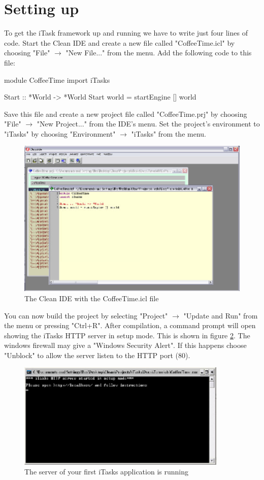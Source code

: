 \documentclass[a4paper,11pt]{article}
\begin{document}
\section{Setting up}
To get the iTask framework up and running we have to write just four lines of code. Start the Clean IDE and create a new file called "CoffeeTime.icl" by choosing  "File" $\rightarrow$ "New File..." from the menu. Add the following code to this file:
\begin{CleanCode}
module CoffeeTime
import iTasks

Start :: *World -> *World
Start world = startEngine [] world
\end{CleanCode}
Save this file and create a new project file called "CoffeeTime.prj" by choosing "File" $\rightarrow$ "New Project..." from the IDE's menu. Set the project's environment to "iTasks" by choosing "Environment" $\rightarrow$ "iTasks" from the menu.
\begin{figure}[h]
\centerline{\includegraphics[width=12cm]{GettingStarted-img/ide-version1.eps}}
\caption{The Clean IDE with the CoffeeTime.icl file} \label{ide-version1}
\end{figure}
You can now build the project by selecting "Project" $\rightarrow$ "Update and Run" from the menu or pressing "Ctrl+R". After compilation, a command prompt will open showing the iTasks HTTP server in setup mode. This is shown in figure \ref{setup-server}.  The windows firewall may give a "Windows Security Alert". If this happens choose "Unblock" to allow the server listen to the HTTP port (80).
\begin{figure}[h]
\centerline{\includegraphics[width=10cm]{GettingStarted-img/setup-server.eps}}
\caption{The server of your first iTasks application is running} \label{setup-server}
\end{figure}
\end{document}
